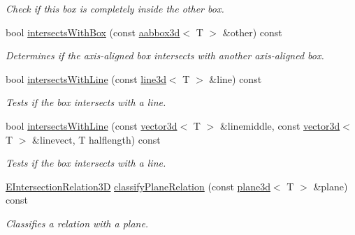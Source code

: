 \begin{DoxyCompactItemize}
\begin{DoxyCompactList}\small\item\em Check if this box is completely inside the \textquotesingle{}other\textquotesingle{} box. \end{DoxyCompactList}\item 
bool \hyperlink{classirr_1_1core_1_1aabbox3d_a5d3d9d09354c4c362625dab7a15dcedb}{intersects\+With\+Box} (const \hyperlink{classirr_1_1core_1_1aabbox3d}{aabbox3d}$<$ T $>$ \&other) const 
\begin{DoxyCompactList}\small\item\em Determines if the axis-\/aligned box intersects with another axis-\/aligned box. \end{DoxyCompactList}\item 
bool \hyperlink{classirr_1_1core_1_1aabbox3d_a34923d0c727e92df84906f256277e503}{intersects\+With\+Line} (const \hyperlink{classirr_1_1core_1_1line3d}{line3d}$<$ T $>$ \&line) const 
\begin{DoxyCompactList}\small\item\em Tests if the box intersects with a line. \end{DoxyCompactList}\item 
bool \hyperlink{classirr_1_1core_1_1aabbox3d_a7e252d09fdc83431955f48156ca2ae5c}{intersects\+With\+Line} (const \hyperlink{classirr_1_1core_1_1vector3d}{vector3d}$<$ T $>$ \&linemiddle, const \hyperlink{classirr_1_1core_1_1vector3d}{vector3d}$<$ T $>$ \&linevect, T halflength) const 
\begin{DoxyCompactList}\small\item\em Tests if the box intersects with a line. \end{DoxyCompactList}\item 
\hyperlink{namespaceirr_1_1core_a8a9999eb0d151083f48afe5f7d17a96c}{E\+Intersection\+Relation3D} \hyperlink{classirr_1_1core_1_1aabbox3d_aec3f7aa9c61ac773eea6c12924bcaea6}{classify\+Plane\+Relation} (const \hyperlink{classirr_1_1core_1_1plane3d}{plane3d}$<$ T $>$ \&plane) const 
\begin{DoxyCompactList}\small\item\em Classifies a relation with a plane. \end{DoxyCompactList}\end{DoxyCompactItemize}
